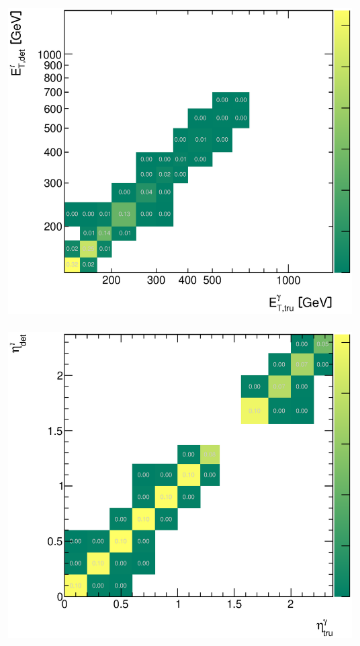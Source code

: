 \documentclass[12pt, twoside]{article}
\numberwithin{equation}{section}
\numberwithin{figure}{section}
\newenvironment{changemargin}[2]{%
\begin{list}{}{%
\setlength{\topsep}{0pt}%
\setlength{\leftmargin}{#1}%
\setlength{\rightmargin}{#2}%
\setlength{\listparindent}{\parindent}%
\setlength{\itemindent}{\parindent}%
\setlength{\parsep}{\parskip}%
}%
\item[]}{\end{list}}
\begin{document}
\begin{figure}
    \centering
    \checkoddpage
    \ifoddpage
        \begin{changemargin}{-1.0cm}{-0.75cm}
    \else
        \begin{changemargin}{-0.75cm}{-1.0cm}
    \fi
        \begin{subfigure}[b]{0.37\textwidth}
            \includegraphics[width=\textwidth]{./images/CorrelationMatricesSherpa/REC_vs_HAD-101.eps}
            \subcaption{}
            \label{fig:SherpaCorrelationEtPhoton}
        \end{subfigure}
        \begin{subfigure}[b]{0.37\textwidth}
            \includegraphics[width=\textwidth]{./images/CorrelationMatricesSherpa/REC_vs_HAD-102.eps}

\end{subfigure}
\end{changemargin}
\end{changemargin}
\end{figure}
\end{document}
